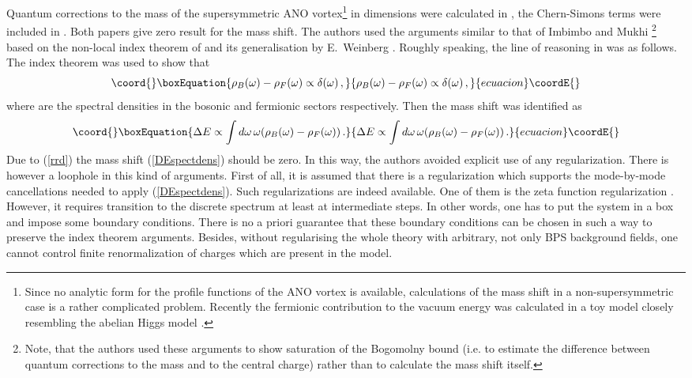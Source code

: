 \documentclass[a4paper,12pt]{article}
\begin{document}
Quantum corrections to the mass of the supersymmetric ANO vortex\footnote{
Since no analytic form for the profile functions of the ANO vortex is
available, calculations of the mass shift in a non-supersymmetric case
is a rather complicated problem. Recently the fermionic contribution
to the vacuum energy was calculated in a toy model closely resembling 
the abelian Higgs model \cite{BorDro}.} in \coordHE{}
dimensions were calculated in \cite{Schmidt:cu}, the Chern-Simons terms
were included in \cite{Lee:1994pm}. Both papers \cite{Schmidt:cu,Lee:1994pm}
give zero result for the mass shift. The authors used the arguments 
similar to that of Imbimbo and Mukhi \cite{Imbimbo:1984nq}\footnote{Note, 
that the authors \cite{Imbimbo:1984nq}
used these arguments to show saturation of the
Bogomolny bound (i.e. to estimate the difference between quantum corrections
to the mass and to the central charge) rather than to calculate the mass shift
itself.}
based on the non-local index
theorem of \cite{Callias:1977kg}
and its generalisation by E.~Weinberg \cite{Weinberg:er}.
Roughly speaking, the line of reasoning in \cite{Schmidt:cu,Lee:1994pm}
was as follows. The index theorem was used to show that
\begin{equation}\coord{}\boxEquation{
\rho_B(\omega ) - \rho_F(\omega )\propto \delta (\omega ) \,,
\label{rrd}
}{
\rho_B(\omega ) - \rho_F(\omega )\propto \delta (\omega ) \,,
}{ecuacion}\coordE{}\end{equation}
where \coordHE{} are the spectral densities in the bosonic and fermionic
sectors respectively. Then the mass shift was identified as
\begin{equation}\coord{}\boxEquation{
\Delta E\propto \int d\omega\, \omega (\rho_B(\omega ) - \rho_F(\omega ))
\,.\label{DEspectdens}
}{
\Delta E\propto \int d\omega\, \omega (\rho_B(\omega ) - \rho_F(\omega ))
\,.}{ecuacion}\coordE{}\end{equation}
Due to (\ref{rrd}) the mass shift (\ref{DEspectdens}) should be zero.
In this way, the authors \cite{Schmidt:cu,Lee:1994pm} avoided explicit use
of any regularization. There is however a loophole in this kind of
arguments. First of all, it is assumed that there is a regularization
which supports the mode-by-mode cancellations needed to apply 
(\ref{DEspectdens}). Such regularizations are indeed available.
One of them is the zeta function regularization \cite{zfun}.
However, it requires transition to the discrete spectrum
at least at intermediate
steps. In other words, one has to put the system in a box and
impose some boundary conditions. There is no a priori guarantee that
these boundary conditions can be chosen in such a way to preserve
the index theorem arguments. Besides, without regularising the whole
theory with arbitrary, not only BPS background fields, one cannot
control finite renormalization of charges which are present in the
model.
\end{document}
